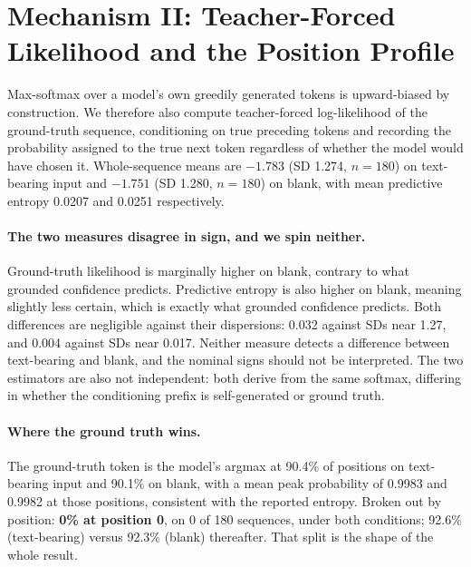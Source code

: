 \documentclass{article}
\begin{document}
\section{Mechanism II: Teacher-Forced Likelihood and the Position Profile}
\label{sec:position}

Max-softmax over a model's own greedily generated tokens is upward-biased by construction. We
therefore also compute teacher-forced log-likelihood of the ground-truth sequence,
conditioning on true preceding tokens and recording the probability assigned to the true next
token regardless of whether the model would have chosen it. Whole-sequence means are $-1.783$
(SD 1.274, $n=180$) on text-bearing input and $-1.751$ (SD 1.280, $n=180$) on blank, with mean
predictive entropy 0.0207 and 0.0251 respectively.

\paragraph{The two measures disagree in sign, and we spin neither.} Ground-truth likelihood is
marginally higher on blank, contrary to what grounded confidence predicts. Predictive entropy
is also higher on blank, meaning slightly less certain, which is exactly what grounded
confidence predicts. Both differences are negligible against their dispersions: 0.032 against
SDs near 1.27, and 0.004 against SDs near 0.017. Neither measure detects a difference between
text-bearing and blank, and the nominal signs should not be interpreted. The two estimators are also
not independent: both derive from the same softmax, differing in whether the conditioning
prefix is self-generated or ground truth.

\paragraph{Where the ground truth wins.} The ground-truth token is the model's argmax at 90.4\%
of positions on text-bearing input and 90.1\% on blank, with a mean peak probability of 0.9983 and
0.9982 at those positions, consistent with the reported entropy. Broken out by position:
\textbf{0\% at position 0}, on 0 of 180 sequences, under both conditions; 92.6\% (text-bearing) versus
92.3\% (blank) thereafter. That split is the shape of the whole result.
\end{document}
